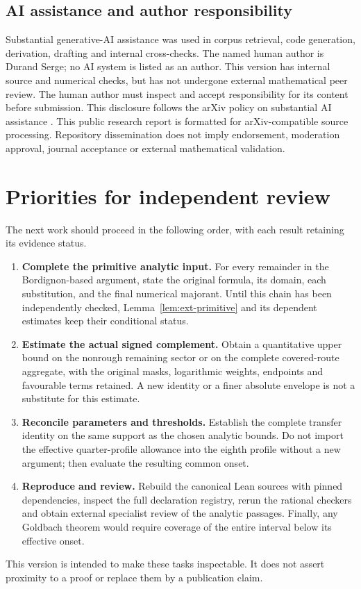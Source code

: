 \documentclass[11pt,a4paper]{article}
\theoremstyle{definition}
\theoremstyle{remark}
\begin{document}
\subsection{AI assistance and author responsibility}
Substantial generative-AI assistance was used in corpus retrieval, code generation, derivation, drafting and internal cross-checks. The named human author is Durand Serge; no AI system is listed as an author. This version has internal source and numerical checks, but has not undergone external mathematical peer review. The human author must inspect and accept responsibility for its content before submission. This disclosure follows the arXiv policy on substantial AI assistance \cite{arxivpolicy}. This public research report is formatted for arXiv-compatible source processing. Repository dissemination does not imply endorsement, moderation approval, journal acceptance or external mathematical validation.

\clearpage
\section{Priorities for independent review}\label{sec:review-priorities}
The next work should proceed in the following order, with each result retaining its evidence status.
\begin{enumerate}
\item \textbf{Complete the primitive analytic input.} For every remainder in the Bordignon-based argument, state the original formula, its domain, each substitution, and the final numerical majorant. Until this chain has been independently checked, Lemma~\ref{lem:ext-primitive} and its dependent estimates keep their conditional status.
\item \textbf{Estimate the actual signed complement.} Obtain a quantitative upper bound on the nonrough remaining sector or on the complete covered-route aggregate, with the original masks, logarithmic weights, endpoints and favourable terms retained. A new identity or a finer absolute envelope is not a substitute for this estimate.
\item \textbf{Reconcile parameters and thresholds.} Establish the complete transfer identity on the same support as the chosen analytic bounds. Do not import the effective quarter-profile allowance into the eighth profile without a new argument; then evaluate the resulting common onset.
\item \textbf{Reproduce and review.} Rebuild the canonical Lean sources with pinned dependencies, inspect the full declaration registry, rerun the rational checkers and obtain external specialist review of the analytic passages. Finally, any Goldbach theorem would require coverage of the entire interval below its effective onset.
\end{enumerate}
This version is intended to make these tasks inspectable. It does not assert proximity to a proof or replace them by a publication claim.
\end{document}
